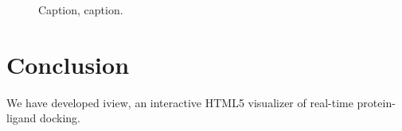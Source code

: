 \documentclass{bioinfo}
\begin{document}
\begin{figure}[!tpb]%
\caption{Caption, caption.}\label{fig:01}
\end{figure}

\section{Conclusion}

We have developed iview, an interactive HTML5 visualizer of real-time protein-ligand docking.


%
%
%
%
%
%


\end{document}
